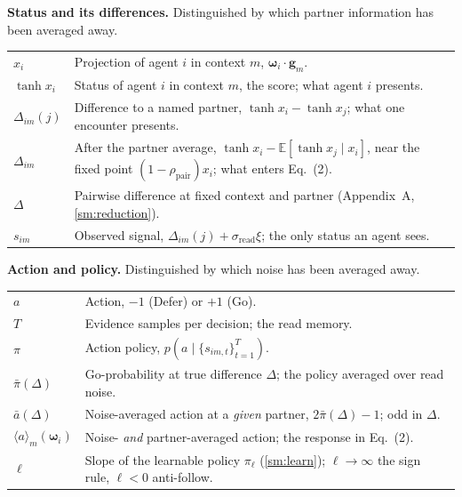 \documentclass[
  aps,prx,
  preprint,
  superscriptaddress,
  nofootinbib
]{revtex4-2}
\newcommand{\w}{\bm{\omega}}
\newcommand{\g}{\mathbf{g}}
\newcommand{\rhopair}{\rho_{\mathrm{pair}}}
\newcommand{\sread}{\sigma_{\mathrm{read}}}
\newcommand{\pibar}{\bar\pi}
\begin{document}
{\footnotesize

\smallskip\noindent\textbf{Status and its differences.} Distinguished by which partner information has been averaged away.\\[3pt]
\begin{tabular}{@{}l@{\hspace{1.6em}}l@{}}
\toprule
$x_i$ & Projection of agent $i$ in context $m$, $\w_i\cdot\g_m$. \\
$\tanh x_i$ & Status of agent $i$ in context $m$, the score; what agent $i$ presents. \\
$\Delta_{im}(j)$ & Difference to a named partner, $\tanh x_i-\tanh x_j$; what one encounter presents. \\
$\Delta_{im}$ & After the partner average, $\tanh x_i-\mathbb E[\tanh x_j\mid x_i]$, near the fixed point $(1-\rhopair)x_i$; what enters Eq.~(2). \\
$\Delta$ & Pairwise difference at fixed context and partner (Appendix~A, \cref{sm:reduction}). \\
$s_{im}$ & Observed signal, $\Delta_{im}(j)+\sread\xi$; the only status an agent sees. \\
\bottomrule
\end{tabular}

\smallskip\noindent\textbf{Action and policy.} Distinguished by which noise has been averaged away.\\[3pt]
\begin{tabular}{@{}l@{\hspace{1.6em}}l@{}}
\toprule
$a$ & Action, $-1$ (Defer) or $+1$ (Go). \\
$T$ & Evidence samples per decision; the read memory. \\
$\pi$ & Action policy, $p(a\mid\{s_{im,t}\}_{t=1}^{T})$. \\
$\pibar(\Delta)$ & Go-probability at true difference $\Delta$; the policy averaged over read noise. \\
$\bar a(\Delta)$ & Noise-averaged action at a \emph{given} partner, $2\pibar(\Delta)-1$; odd in $\Delta$. \\
$\langle a\rangle_m(\w_i)$ & Noise- \emph{and} partner-averaged action; the response in Eq.~(2). \\
$\ell$ & Slope of the learnable policy $\pi_\ell$ (\cref{sm:learn}); $\ell\to\infty$ the sign rule, $\ell<0$ anti-follow. \\
\bottomrule
\end{tabular}

}
\end{document}
